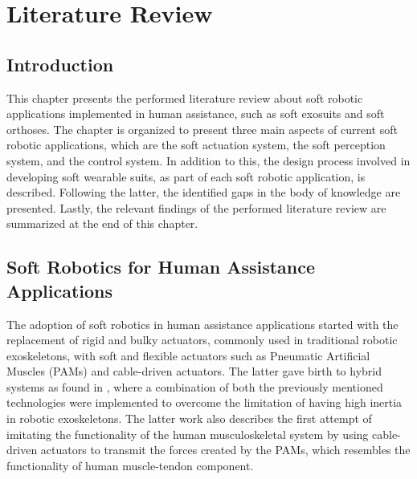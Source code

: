 \chapter{Literature Review} \label{ch2:Literature}

\section{Introduction}

This chapter presents the performed literature review about soft robotic applications implemented in human assistance, such as soft exosuits and soft orthoses. The chapter is organized to present three main aspects of current soft robotic applications, which are the soft actuation system, the soft perception system, and the control system. In addition to this, the design process involved in developing soft wearable suits, as part of each soft robotic application, is described. Following the latter, the identified gaps in the body of knowledge are presented. Lastly, the relevant findings of the performed literature review are summarized at the end of this chapter.

\section{Soft Robotics for Human Assistance Applications}


The adoption of soft robotics in human assistance applications started with the replacement of rigid and bulky actuators, commonly used in traditional robotic exoskeletons, with soft and flexible actuators such as Pneumatic Artificial Muscles (PAMs) and cable-driven actuators. The latter gave birth to hybrid systems as found in \cite{Noda2014}, where a combination of both the previously mentioned technologies were implemented to overcome the limitation of having high inertia in robotic exoskeletons. The latter work also describes the first attempt of imitating the functionality of the human musculoskeletal system by using cable-driven actuators to transmit the forces created by the PAMs, which resembles the functionality of human muscle-tendon component.

